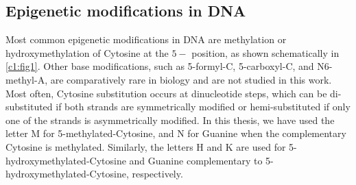 \subsection{Epigenetic modifications in DNA}\label{c1:s2:sb3}
Most common epigenetic modifications in DNA are methylation or hydroxymethylation of Cytosine at the $5-$ position, as shown schematically in \cref{c1:fig1}.
Other base modifications, such as 5-formyl-C, 5-carboxyl-C, and N6-methyl-A, are comparatively rare in biology and are not studied in this work.
Most often, Cytosine substitution occurs at \cpg dinucleotide steps\cite{jabbari2004cytosine}, which can be di-substituted if both strands are symmetrically modified or hemi-substituted if only one of the strands is asymmetrically modified.
In this thesis, we have used the letter M for 5-methylated-Cytosine, and N for Guanine when the complementary Cytosine is methylated. 
Similarly, the letters H and K are used for 5- hydroxymethylated-Cytosine and Guanine complementary to 5-hydroxymethylated-Cytosine, respectively.

